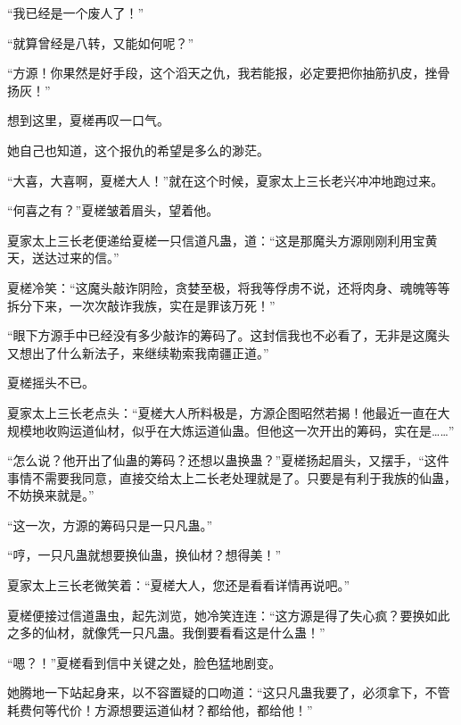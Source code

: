 \begin{this_body}
“我已经是一个废人了！”

“就算曾经是八转，又能如何呢？”

“方源！你果然是好手段，这个滔天之仇，我若能报，必定要把你抽筋扒皮，挫骨扬灰！”

想到这里，夏槎再叹一口气。

她自己也知道，这个报仇的希望是多么的渺茫。

“大喜，大喜啊，夏槎大人！”就在这个时候，夏家太上三长老兴冲冲地跑过来。

“何喜之有？”夏槎皱着眉头，望着他。

夏家太上三长老便递给夏槎一只信道凡蛊，道：“这是那魔头方源刚刚利用宝黄天，送达过来的信。”

夏槎冷笑：“这魔头敲诈阴险，贪婪至极，将我等俘虏不说，还将肉身、魂魄等等拆分下来，一次次敲诈我族，实在是罪该万死！”

“眼下方源手中已经没有多少敲诈的筹码了。这封信我也不必看了，无非是这魔头又想出了什么新法子，来继续勒索我南疆正道。”

夏槎摇头不已。

夏家太上三长老点头：“夏槎大人所料极是，方源企图昭然若揭！他最近一直在大规模地收购运道仙材，似乎在大炼运道仙蛊。但他这一次开出的筹码，实在是……”

“怎么说？他开出了仙蛊的筹码？还想以蛊换蛊？”夏槎扬起眉头，又摆手，“这件事情不需要我同意，直接交给太上二长老处理就是了。只要是有利于我族的仙蛊，不妨换来就是。”

“这一次，方源的筹码只是一只凡蛊。”

“哼，一只凡蛊就想要换仙蛊，换仙材？想得美！”

夏家太上三长老微笑着：“夏槎大人，您还是看看详情再说吧。”

夏槎便接过信道蛊虫，起先浏览，她冷笑连连：“这方源是得了失心疯？要换如此之多的仙材，就像凭一只凡蛊。我倒要看看这是什么蛊！”

“嗯？！”夏槎看到信中关键之处，脸色猛地剧变。

她腾地一下站起身来，以不容置疑的口吻道：“这只凡蛊我要了，必须拿下，不管耗费何等代价！方源想要运道仙材？都给他，都给他！”

\end{this_body}

